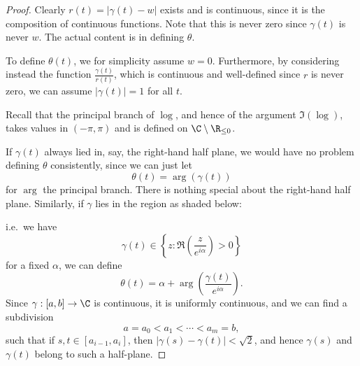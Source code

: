 \documentclass[a4paper]{article}
\begin{document}
\begin{proof}
  Clearly $r(t) = |\gamma(t) - w|$ exists and is continuous, since it is the composition of continuous functions. Note that this is never zero since $\gamma(t)$ is never $w$. The actual content is in defining $\theta$.

  To define $\theta(t)$, we for simplicity assume $w = 0$. Furthermore, by considering instead the function $\frac{\gamma(t)}{r(t)}$, which is continuous and well-defined since $r$ is never zero, we can assume $|\gamma(t)| = 1$ for all $t$.

  Recall that the principal branch of $\log$, and hence of the argument $\Im (\log)$, takes values in $(-\pi, \pi)$ and is defined on $\C \setminus \R_{\leq 0}$.
  \begin{center}
  \end{center}
  If $\gamma(t)$ always lied in, say, the right-hand half plane, we would have no problem defining $\theta$ consistently, since we can just let
  \[
    \theta(t) = \arg(\gamma(t))
  \]
  for $\arg$ the principal branch. There is nothing special about the right-hand half plane. Similarly, if $\gamma$ lies in the region as shaded below:
  \begin{center}
  \end{center}
  i.e.\ we have
  \[
    \gamma(t) \in \left\{z : \Re\left(\frac{z}{e^{i\alpha}}\right) > 0\right\}
  \]
  for a fixed $\alpha$, we can define
  \[
    \theta(t) = \alpha + \arg\left(\frac{\gamma(t)}{e^{i\alpha}}\right).
  \]
  Since $\gamma: [a, b] \to \C$ is continuous, it is uniformly continuous, and we can find a subdivision
  \[
    a = a_0 < a_1 < \cdots < a_m = b,
  \]
  such that if $s, t \in [a_{i - 1}, a_i]$, then $|\gamma(s) - \gamma(t)| < \sqrt{2}$, and hence $\gamma(s)$ and $\gamma(t)$ belong to such a half-plane.


\end{proof}
\end{document}
